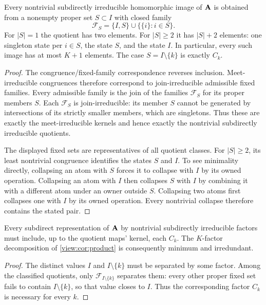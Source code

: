 \begin{proposition}\label{view:thm:si}
Every nontrivial subdirectly irreducible homomorphic image of $\mathbf A$ is
obtained from a nonempty proper set $S\subset I$ with closed family
\[
 \mathcal F_S=\{I,S\}\cup\{\{i\}:i\in S\}.
\]
For $|S|=1$ the quotient has two elements. For $|S|\geq2$ it has
$|S|+2$ elements: one singleton state per $i\in S$, the state $S$, and
the state $I$. In particular, every such image has at most $K+1$ elements.
The case $S=I\setminus\{k\}$ is exactly $C_k$.
\end{proposition}
\begin{proof}
The congruence/fixed-family correspondence reverses inclusion.
Meet-irreducible congruences therefore correspond to join-irreducible
admissible fixed families. Every admissible family is the join of the
families $\mathcal F_S$ for its proper members $S$. Each
$\mathcal F_S$ is join-irreducible: its member $S$ cannot be generated by
intersections of its strictly smaller members, which are singletons.
Thus these are exactly the meet-irreducible kernels and hence exactly the
nontrivial subdirectly irreducible quotients.

The displayed fixed sets are representatives of all quotient classes.
For $|S|\geq2$, its least nontrivial congruence identifies the states $S$
and $I$. To see minimality directly, collapsing an atom with $S$ forces
it to collapse with $I$ by its owned operation. Collapsing an atom with
$I$ then collapses $S$ with $I$ by combining it with a different atom
under an owner outside $S$. Collapsing two atoms first collapses one
with $I$ by its owned operation. Every nontrivial collapse therefore
contains the stated pair.
\end{proof}

\begin{corollary}
Every subdirect representation of $\mathbf A$ by nontrivial subdirectly
irreducible factors must include, up to the quotient maps' kernel,
each $C_k$. The $K$-factor decomposition of
\cref{view:cor:product} is consequently minimum and irredundant.
\end{corollary}
\begin{proof}
The distinct values $I$ and $I\setminus\{k\}$ must be separated by some
factor. Among the classified quotients, only
$\mathcal F_{I\setminus\{k\}}$ separates them: every other proper
fixed set fails to contain $I\setminus\{k\}$, so that value closes to
$I$. Thus the corresponding factor $C_k$ is necessary for every $k$.
\end{proof}

